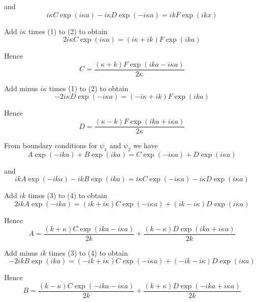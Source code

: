 and
\begin{equation*}
i\kappa C\exp(i\kappa a)-i\kappa D\exp(-i\kappa a)=ikF\exp(ikx)\tag{2}
\end{equation*}

Add $i\kappa$ times (1) to (2) to obtain
\begin{equation*}
2i\kappa C\exp(i\kappa a)=(i\kappa+ik)F\exp(ika)
\end{equation*}

Hence
\begin{equation*}
C=\frac{(\kappa+k)F\exp(ika-i\kappa a)}{2\kappa}
\end{equation*}

Add minus $i\kappa$ times (1) to (2) to obtain
\begin{equation*}
-2i\kappa D\exp(-i\kappa a)=(-i\kappa+ik)F\exp(ika)
\end{equation*}

Hence
\begin{equation*}
D=\frac{(\kappa-k)F\exp(ika+i\kappa a)}{2\kappa}
\end{equation*}

From boundary conditions for $\psi_1$ and $\psi_2$ we have
\begin{equation*}
A\exp(-ika)+B\exp(ika)=C\exp(-i\kappa a)+D\exp(i\kappa a)\tag{3}
\end{equation*}

and
\begin{equation*}
ikA\exp(-ika)-ikB\exp(ika)=i\kappa C\exp(-i\kappa a)-i\kappa D\exp(i\kappa a)\tag{4}
\end{equation*}

Add $ik$ times (3) to (4) to obtain
\begin{equation*}
2ikA\exp(-ika)=(ik+i\kappa)C\exp(-i\kappa a)+(ik-i\kappa)D\exp(i\kappa a)
\end{equation*}

Hence
\begin{equation*}
A=\frac{(k+\kappa)C\exp(ika-i\kappa a)}{2k}+\frac{(k-\kappa)D\exp(ika+i\kappa a)}{2k}
\end{equation*}

Add minus $ik$ times (3) to (4) to obtain
\begin{equation*}
-2ikB\exp(ika)=(-ik+i\kappa)C\exp(-i\kappa a)+(-ik-i\kappa)D\exp(i\kappa a)
\end{equation*}

Hence
\begin{equation*}
B=\frac{(k-\kappa)C\exp(-ika-i\kappa a)}{2k}+\frac{(k+\kappa)D\exp(-ika+i\kappa a)}{2k}
\end{equation*}

